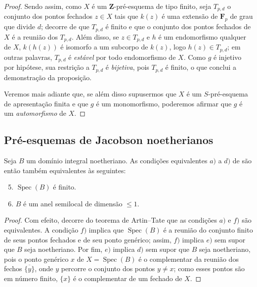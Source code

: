 \begin{proof}
Sendo assim, como $X$ é um $\mathbf{Z}$-pré-esquema de tipo finito, seja $T_{p,d}$ o conjunto dos pontos fechados $z\in X$ tais que $k(z)$ é uma extensão de $\mathbf{F}_p$ de grau que divide $d$; decorre de  que $T_{p,d}$ é finito e que o conjunto dos pontos fechados de $X$ é a reunião dos $T_{p,d}$.
Além disso, se $z\in T_{p,d}$ e $h$ é um endomorfismo qualquer de $X$, $k(h(z))$ é isomorfo a um subcorpo de $k(z)$, logo $h(z)\in T_{p,d}$; em outras palavras, $T_{p,d}$ é \emph{estável} por todo endomorfismo de $X$.
Como $g$ é injetivo por hipótese, sua restrição a $T_{p,d}$ é \emph{bijetiva}, pois $T_{p,d}$ é finito, o que conclui a demonstração da proposição.

Veremos mais adiante  que, se além disso supusermos que $X$ é um $S$-pré-esquema de apresentação finita e que $g$ é um monomorfismo, poderemos afirmar que $g$ é um \emph{automorfismo} de $X$.
\end{proof}

\subsection{Pré-esquemas de Jacobson noetherianos}
\label{subsection:IV.10.5}

\begin{proposition}[10.5.1]
\label{IV.10.5.1}
Seja $B$ um domínio integral noetheriano.
As condições equivalentes $a)$ a $d)$ de  são então também equivalentes às seguintes:
\begin{enumerate}[label=\emph{\alph*)}]
  \setcounter{enumi}{4}
  \item $\operatorname{Spec}(B)$ é finito.
  \item $B$ é um anel semilocal de dimensão $\leq 1$.
\end{enumerate}
\end{proposition}

\begin{proof}
Com efeito, decorre do teorema de Artin--Tate  que as condições $a)$ e $f)$ são equivalentes.
A condição $f)$ implica que $\operatorname{Spec}(B)$ é a reunião do conjunto
finito de seus pontos fechados e de seu ponto genérico; assim, $f)$ implica $e)$ sem supor que $B$ seja noetheriano.
Por fim, $e)$ implica $d)$ sem supor que $B$ seja noetheriano, pois o ponto genérico $x$ de $X=\operatorname{Spec}(B)$ é o complementar da reunião dos fechos $\overline{\{y\}}$, onde $y$ percorre o conjunto dos pontos $y\neq x$; como esses pontos são em número finito, $\{x\}$ é o complementar de um fechado de $X$.
\end{proof}

